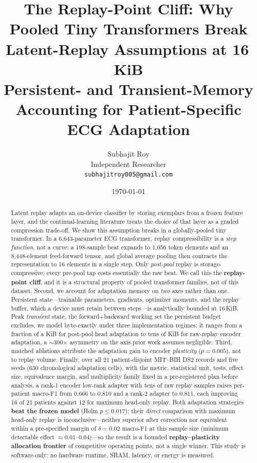 \documentclass[11pt]{article}
\title{\textbf{The Replay-Point Cliff: Why Pooled Tiny Transformers Break
Latent-Replay Assumptions at 16\,KiB}\\
\large Persistent- and Transient-Memory Accounting for Patient-Specific ECG
Adaptation}
\author{Subhajit Roy\\
\small Independent Researcher\\
\small \texttt{subhajitroy005@gmail.com}}
\date{\today}
\newcommand{\macrof}{macro-F1}
\begin{document}
\maketitle

\begin{abstract}
Latent replay adapts an on-device classifier by storing exemplars from a frozen
feature layer, and the continual-learning literature treats the choice of that
layer as a graded compression trade-off. We show this assumption breaks in a
globally-pooled tiny transformer. In a 6{,}643-parameter ECG transformer,
replay compressibility is a \emph{step function}, not a curve: a 198-sample beat
expands to 1{,}056 token elements and an 8{,}448-element feed-forward tensor, and
global average pooling then contracts the representation to 16 elements in a
single step. Only \emph{post-pool} replay is storage-compressive; every
pre-pool tap costs essentially the raw beat. We call this the
\textbf{replay-point cliff}, and it is a structural property of pooled
transformer families, not of this dataset. Second, we account for adaptation
memory on \emph{two} axes rather than one. Persistent state---trainable
parameters, gradients, optimizer moments, and the replay buffer, which a device
must retain between steps---is analytically bounded at 16\,KiB. Peak
\emph{transient} state, the forward+backward working set the persistent budget
excludes, we model byte-exactly under three implementation regimes: it ranges
from a fraction of a KiB for post-pool head adaptation to tens of KiB for
raw-replay encoder adaptation, a $\sim$300$\times$ asymmetry on the axis prior
work assumes negligible. Third, matched ablations attribute the adaptation gain
to encoder \emph{plasticity} ($p = 0.005$), not to replay volume. Finally, over
all 21 patient-disjoint MIT--BIH DS2 records and five seeds (630 chronological
adaptation cells), with the metric, statistical unit, tests, effect size,
equivalence margin, and multiplicity family fixed in a pre-registered plan
before analysis, a rank-1 encoder low-rank adapter with tens of raw replay
samples raises per-patient \macrof{} from $0.666$ to $0.810$ and a rank-2 adapter
to $0.811$, each improving 16 of 21 patients against 12 for maximum head-only
replay. Both adaptation strategies \textbf{beat the frozen model} (Holm
$p \le 0.017$); their \emph{direct} comparison with maximum head-only replay is
inconclusive---neither superior after correction nor equivalent within a
pre-specified margin of $\delta = 0.02$ \macrof{} at this sample size (minimum
detectable effect $\approx 0.01$--$0.04$)---so the result is a bounded
\textbf{replay--plasticity allocation frontier} of competitive operating points,
not a single winner. This study is software-only: no hardware runtime, SRAM,
latency, or energy is measured.
\end{abstract}
\end{document}
